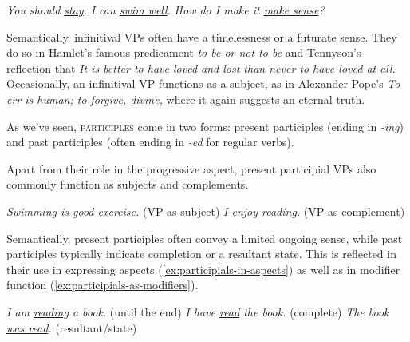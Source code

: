 \ea
\ea \textit{You should \uline{stay}.}
\ex \textit{I can \uline{swim well}.}
\ex \textit{How do I make it \uline{make sense}?}
\z\z

Semantically, infinitival VPs often have a timelessness or a futurate sense. They do so in Hamlet's famous predicament \textit{to be or not to be} and Tennyson's reflection that \textit{It is better to have loved and lost than never to have loved at all.} Occasionally, an infinitival VP functions as a subject, as in Alexander Pope's \textit{To err is human; to forgive, divine,} where it again suggests an eternal truth.

\bigskip

As we've seen, \textsc{participles} come in two forms: present participles (ending in \textit{-ing}) and past participles (often ending in \textit{-ed} for regular verbs). 

Apart from their role in the progressive aspect, present participial VPs also commonly function as subjects and complements.

\ea
\ea \textit{\uline{Swimming} is good exercise.} \hfill(VP as subject)
\ex \textit{I enjoy \uline{reading}.} \hfill(VP as complement)
\z\z

Semantically, present participles often convey a limited ongoing sense, while past participles typically indicate completion or a resultant state. This is reflected in their use in expressing aspects (\ref{ex:participials-in-aspects}) as well as in modifier function (\ref{ex:participials-as-modifiers}).

\ea \label{ex:participials-in-aspects}
\ea \textit{I am \uline{reading} a book.} \hfill(until the end)
\ex \textit{I have \uline{read} the book.} \hfill(complete)
\ex \textit{The book \uline{was read}.} \hfill(resultant/state)
\z\z



